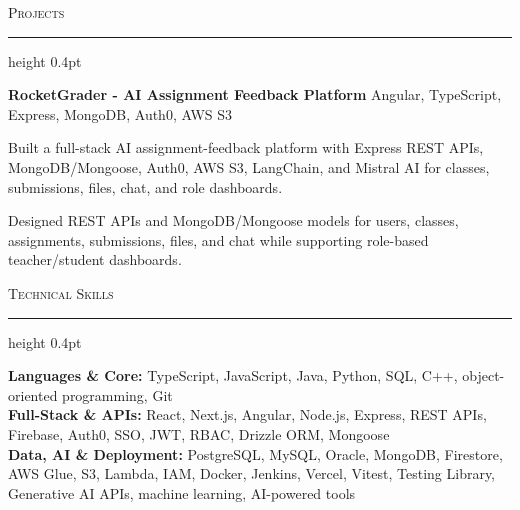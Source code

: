 \documentclass[letterpaper,11pt]{article}
\newcommand{\resumesection}[1]{%
  \par\vspace{2pt}%
  {\large\scshape #1}\par\vspace{2pt}%
  \hrule height 0.4pt\vspace{2pt}%
}
\newcommand{\projectHeading}[2]{
  \textbf{#1} \hfill #2
}
\begin{document}
\resumesection{Projects}
\projectHeading{RocketGrader - AI Assignment Feedback Platform}{Angular, TypeScript, Express, MongoDB, Auth0, AWS S3}
\begin{tightitemize}
  \item Built a full-stack AI assignment-feedback platform with Express REST APIs, MongoDB/Mongoose, Auth0, AWS S3, LangChain, and Mistral AI for classes, submissions, files, chat, and role dashboards.
  \item Designed REST APIs and MongoDB/Mongoose models for users, classes, assignments, submissions, files, and chat while supporting role-based teacher/student dashboards.
\end{tightitemize}

\resumesection{Technical Skills}
\textbf{Languages \& Core:} TypeScript, JavaScript, Java, Python, SQL, C++, object-oriented programming, Git\\
\textbf{Full-Stack \& APIs:} React, Next.js, Angular, Node.js, Express, REST APIs, Firebase, Auth0, SSO, JWT, RBAC, Drizzle ORM, Mongoose\\
\textbf{Data, AI \& Deployment:} PostgreSQL, MySQL, Oracle, MongoDB, Firestore, AWS Glue, S3, Lambda, IAM, Docker, Jenkins, Vercel, Vitest, Testing Library, Generative AI APIs, machine learning, AI-powered tools
\end{document}
